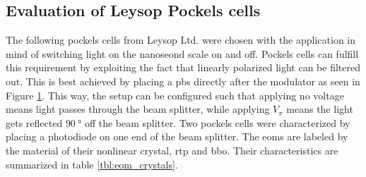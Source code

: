 \begin{figure}[t]
\end{figure}

\subsection{Evaluation of Leysop Pockels cells}

The following pockels cells from Leysop Ltd. were chosen with the application in mind of switching light on the nanoseond scale on and off. Pockels cells can fulfill this requirement by exploiting the fact that linearly polarized light can be filtered out. This is best achieved by placing a \ac{pbs} directly after the modulator as seen in Figure \ref{fig:eom_setup}. This way, the setup can be configured such that applying no voltage means light passes through the beam splitter, while applying $V_\pi$ means the light gets reflected $\SI{90}{\degree}$ off the beam splitter.
Two  pockels cells were characterized by placing a photodiode on one end of the beam splitter. The \acp{eom} are labeled by the material of their nonlinear crystal, \ac{rtp} and \ac{bbo}. Their characteristics are summarized in table \ref{tbl:eom_crystals}.

\begin{figure}[t]
	\label{fig:eom_setup}
\end{figure}

